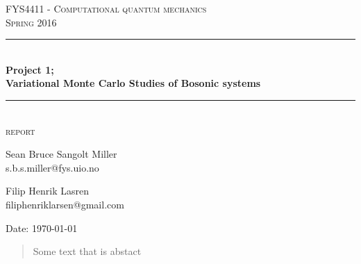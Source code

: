 \documentclass[english, a4paper]{article}
\begin{document}
\renewcommand{\figurename}{Figure}
\begin{titlepage}
\begin{center}

\textsc{\Large FYS4411 - Computational quantum mechanics }\\[0.5cm]
\textsc{\Large Spring 2016}\\[1.5cm]
\rule{\linewidth}{0.5mm} \\[0.4cm]
{ \huge \bfseries  Project 1;\\ Variational Monte Carlo Studies of Bosonic systems}\\[0.10cm]
\rule{\linewidth}{0.5mm} \\[1.5cm]
\textsc{\Large report}\\[1.5cm]


\begin{minipage}{\textwidth}
\begin{minipage}{0.49\textwidth}
    \begin{center} \large
        Sean Bruce Sangolt Miller\\
        {\footnotesize s.b.s.miller@fys.uio.no}
    \end{center}
\end{minipage}
\quad
\begin{minipage}{0.49\textwidth}
    \begin{center} \large
        Filip Henrik Lasren\\
        {\footnotesize filiphenriklarsen@gmail.com}
    \end{center}
\end{minipage}
\end{minipage}
\vfill

\large{Date: \today}

\end{center}
\end{titlepage}

\begin{abstract}
 Some text that is abstact
\end{abstract}


\tableofcontents
\newpage
{}%
\end{document}

